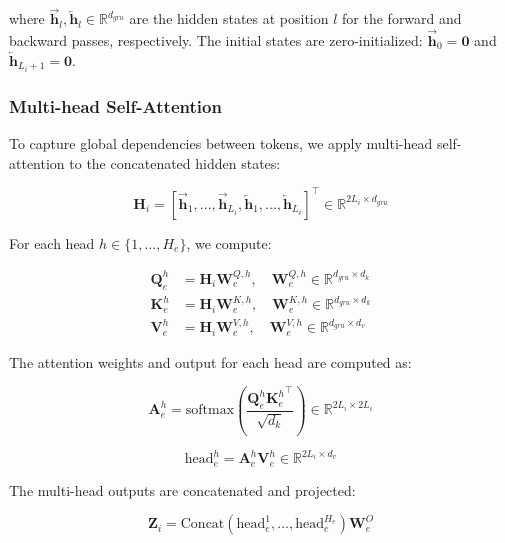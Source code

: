 where $\overrightarrow{\mathbf{h}}_l, \overleftarrow{\mathbf{h}}_l \in \mathbb{R}^{d_{gru}}$ are the hidden states at position $l$ for the forward and backward passes, respectively. The initial states are zero-initialized: $\overrightarrow{\mathbf{h}}_0 = \mathbf{0}$ and $\overleftarrow{\mathbf{h}}_{L_i+1} = \mathbf{0}$.

\subsubsection{Multi-head Self-Attention}
To capture global dependencies between tokens, we apply multi-head self-attention to the concatenated hidden states:

\begin{equation}
    \mathbf{H}_i = [\overrightarrow{\mathbf{h}}_1, ..., \overrightarrow{\mathbf{h}}_{L_i}, \overleftarrow{\mathbf{h}}_1, ..., \overleftarrow{\mathbf{h}}_{L_i}]^\top \in \mathbb{R}^{2L_i \times d_{gru}}
\end{equation}

For each head $h \in \{1,...,H_e\}$, we compute:

\begin{align}
    \mathbf{Q}_e^h &= \mathbf{H}_i\mathbf{W}_e^{Q,h}, \quad \mathbf{W}_e^{Q,h} \in \mathbb{R}^{d_{gru} \times d_k} \\
    \mathbf{K}_e^h &= \mathbf{H}_i\mathbf{W}_e^{K,h}, \quad \mathbf{W}_e^{K,h} \in \mathbb{R}^{d_{gru} \times d_k} \\
    \mathbf{V}_e^h &= \mathbf{H}_i\mathbf{W}_e^{V,h}, \quad \mathbf{W}_e^{V,h} \in \mathbb{R}^{d_{gru} \times d_v}
\end{align}

The attention weights and output for each head are computed as:

\begin{equation}
    \mathbf{A}_e^h = \text{softmax}\left(\frac{\mathbf{Q}_e^h{\mathbf{K}_e^h}^\top}{\sqrt{d_k}}\right) \in \mathbb{R}^{2L_i \times 2L_i}
\end{equation}

\begin{equation}
    \text{head}_e^h = \mathbf{A}_e^h\mathbf{V}_e^h \in \mathbb{R}^{2L_i \times d_v}
\end{equation}

The multi-head outputs are concatenated and projected:

\begin{equation}
    \mathbf{Z}_i = \text{Concat}(\text{head}_e^1, ..., \text{head}_e^{H_e})\mathbf{W}_e^O
\end{equation}

